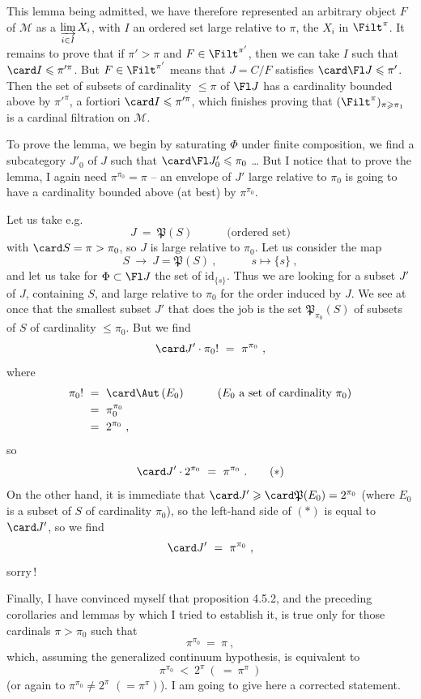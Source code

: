 This lemma being admitted, we have therefore represented an arbitrary object $F$ of $\mathcal{M}$ as a $\varinjlim\limits_{i\in I} X_i$, with $I$ an ordered set large relative to $\pi$, the $X_i$ in $\Filt^{\pi}$. It remains to prove that if $\pi' > \pi$ and $F \in \Filt^{\pi'}$, then we can take $I$ such that $\card I \leqslant \pi'^{\pi}$. But $F \in \Filt^{\pi'}$ means that $J = C/F$ satisfies $\card\Fl J \leqslant \pi'$. Then the set of subsets of cardinality $\leqslant \pi$ of $\Fl J$ has a cardinality bounded above by $\pi'^{\pi}$, a fortiori $\card I \leqslant \pi'^{\pi}$, which finishes proving that $(\Filt^{\pi})_{\pi\geqslant\pi_1}$ is a cardinal filtration on $\mathcal{M}$.


To prove the lemma, we begin by saturating $\Phi$ under finite composition, we find a subcategory $J'_0$ of $J$ such that $\card\Fl J'_0 \leqslant \pi_0$ \ldots{} But I notice that to prove the lemma, I again need $\pi^{\pi_0} = \pi$ -- an envelope of $J'$ large relative to $\pi_0$ is going to have a cardinality bounded above (at best) by $\pi^{\pi_0}$.

Let us take e.g.
\[
J \ =\ \mathfrak{P}(S) \qquad\quad \text{(ordered set)}
\]
with $\card S = \pi > \pi_0$, so $J$ is large relative to $\pi_0$. Let us consider the map
\[
S \ \longrightarrow\ J = \mathfrak{P}(S)\ , \qquad\quad s \longmapsto \{s\}\ ,
\]
and let us take for $\Phi \subset \Fl J$ the set of $\mathrm{id}_{\{s\}}$. Thus we are looking for a subset $J'$ of $J$, containing $S$, and large relative to $\pi_0$ for the order induced by $J$. We see at once that the smallest subset $J'$ that does the job is the set $\mathfrak{P}_{\pi_0}(S)$ of subsets of $S$ of cardinality $\leqslant \pi_0$. But we find
\[
\card J' \cdot \pi_0! \ =\ \pi^{\pi_0}\ ,
\]
where
\[
\begin{aligned}
\pi_0! \ &=\ \card\Aut\,(E_0) \qquad\quad (E_0 \text{ a set of cardinality } \pi_0)\\
&=\ \pi_0^{\pi_0}\\
&=\ 2^{\pi_0}\ ,
\end{aligned}
\]
so
\[
\card J' \cdot 2^{\pi_0} \ =\ \pi^{\pi_0}\ .
\tag*{$(*)$}
\]
On the other hand, it is immediate that $\card J' \geqslant \card\mathfrak{P}(E_0) = 2^{\pi_0}$ (where $E_0$ is a subset of $S$ of cardinality $\pi_0$), so the left-hand side of $(*)$ is equal to $\card J'$, so we find
\[
\card J' \ =\ \pi^{\pi_0}\ ,
\]
sorry\,!

Finally, I have convinced myself that proposition 4.5.2, and the preceding corollaries and lemmas by which I tried to establish it, is true only for those cardinals $\pi > \pi_0$ such that
\[
\pi^{\pi_0} \ =\ \pi\ ,
\]
which, assuming the generalized continuum hypothesis, is equivalent to
\[
\pi^{\pi_0} \ <\ 2^{\pi}\ (\ =\ \pi^{\pi}\ )
\]
(or again to $\pi^{\pi_0} \neq 2^{\pi}$ $(= \pi^{\pi})$). I am going to give
here a corrected statement.

